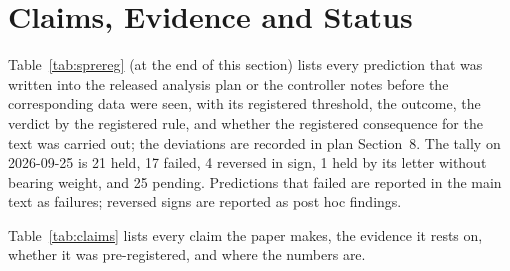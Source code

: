 \documentclass[10pt,journal,compsoc]{IEEEtran}
\begin{document}
\begin{table}[t]
  \centering
  \caption{The layer-local law of Proposition~\ref{prop:law} against the measurement, random initialisation, seed 1, $1{,}600$ images: per dense convolution its width $C$, patch dimension $d$, attainable rank, and $k^*(\tau)$ measured for the drawn kernel, under the sampled law (mean $\pm$ SD over four draws with the measured patch covariance) and from the numerical solution of Silverstein's equation. Generated by \texttt{freeprob\_table.py}.}
  \label{tab:sfreeprob}
  \scriptsize\setlength{\tabcolsep}{4pt}
  
\end{table}

\begin{table}[t]
  \centering
  \caption{The layer-local law on every family (random initialisation, seed 1, $1{,}600$ images, 48 positions): per family and threshold, the number of dense convolutions $L$, the median and maximum of $|$law $-$ measured$|$ in channels, its median in units of $r_{\max}$, the share of layers within $0.05\,r_{\max}$ and within twice the law's own SD (plus one channel), and the Spearman correlation between the law's mean and the measured width across layers. Generated by \texttt{freeprob\_table.py --summary}.}
  \label{tab:sfreeprobsum}
  \scriptsize\setlength{\tabcolsep}{3pt}
  
\end{table}

\section{Claims, Evidence and Status}
\label{supp:claims}

Table~\ref{tab:sprereg} (at the end of this section) lists every prediction that was written into the
released analysis plan or the controller notes before the corresponding data were seen, with its
registered threshold, the outcome, the verdict by the registered rule, and whether the registered
consequence for the text was carried out; the deviations are recorded in plan Section~8. The tally on
2026-09-25 is 21 held, 17 failed, 4 reversed in sign, 1 held by its letter without bearing weight, and
25 pending. Predictions that failed are reported in the main text as failures; reversed signs are
reported as post hoc findings.


Table~\ref{tab:claims} lists every claim the paper makes, the evidence it
rests on, whether it was pre-registered, and where the numbers are.
\end{document}
